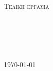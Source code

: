 \documentclass[
11pt, %
oneside, %
english, %
singlespacing, %
headsepline, %
]{MastersDoctoralThesis} %
\author{Δημήτριος \textsc{Δήμου}} %
\begin{document}
\frontmatter %

\pagestyle{plain} %


\begin{titlepage}
\begin{center}

{\scshape\LARGE \univname\par}\vspace{0.5cm} %
{\scshape\Large \deptname\par}\vspace{1.5cm}
\textsc{\Large Τελική εργασία}\\[0.5cm] %

\HRule \\[0.4cm] %
{\huge \bfseries \ttitle\par}\vspace{0.4cm} %
\HRule \\[1.5cm] %
 
\begin{minipage}[t]{0.7\textwidth}
\begin{flushleft} \large
\centerline{\authorname}%
\end{flushleft}
\end{minipage}\\[3cm]

\vfill

{\large \today}\vspace{-10mm} %
 

\end{center}
\end{titlepage}


\end{document}
